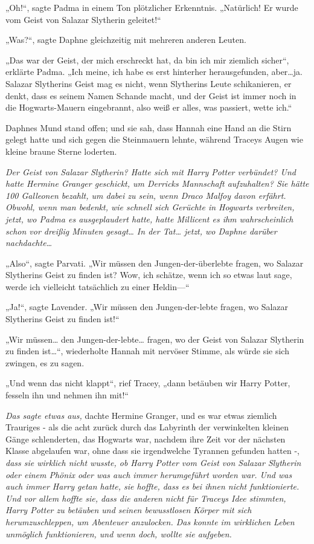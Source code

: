 {„Oh!“, sagte Padma in einem Ton plötzlicher Erkenntnis. „Natürlich! Er wurde vom Geist von Salazar Slytherin geleitet!“

„Was?“, sagte Daphne gleichzeitig mit mehreren anderen Leuten.

„Das war der Geist, der mich erschreckt hat, da bin ich mir ziemlich sicher“, erklärte Padma. „Ich meine, ich habe es erst hinterher herausgefunden, aber…ja. Salazar Slytherins Geist mag es nicht, wenn Slytherins Leute schikanieren, er denkt, dass es seinem Namen Schande macht, und der Geist ist immer noch in die Hogwarts-Mauern eingebrannt, also weiß er alles, was passiert, wette ich.“

Daphnes Mund stand offen; und sie sah, dass Hannah eine Hand an die Stirn gelegt hatte und sich gegen die Steinmauern lehnte, während Traceys Augen wie kleine braune Sterne loderten.

\emph{Der Geist von Salazar Slytherin? Hatte sich mit Harry Potter verbündet? Und hatte Hermine Granger geschickt, um Derricks Mannschaft aufzuhalten? Sie hätte 100 Galleonen bezahlt, um dabei zu sein, wenn Draco Malfoy davon erfährt. Obwohl, wenn man bedenkt, wie schnell sich Gerüchte in Hogwarts verbreiten, jetzt, wo Padma es ausgeplaudert hatte, hatte Millicent es ihm wahrscheinlich schon vor dreißig Minuten gesagt… In der Tat… jetzt, wo Daphne darüber nachdachte…}

„Also“, sagte Parvati. „Wir müssen den Jungen-der-überlebte fragen, wo Salazar Slytherins Geist zu finden ist? Wow, ich schätze, wenn ich so etwas laut sage, werde ich vielleicht tatsächlich zu einer Heldin—“

„Ja!“, sagte Lavender. „Wir müssen den Jungen-der-lebte fragen, wo Salazar Slytherins Geist zu finden ist!“

„Wir müssen… den Jungen-der-lebte… fragen, wo der Geist von Salazar Slytherin zu finden ist…“, wiederholte Hannah mit nervöser Stimme, als würde sie sich zwingen, es zu sagen.

„Und wenn das nicht klappt“, rief Tracey, „dann betäuben wir Harry Potter, fesseln ihn und nehmen ihn mit!“

\emph{Das sagte etwas aus,} dachte Hermine Granger, und es war etwas ziemlich Trauriges - als die acht zurück durch das Labyrinth der verwinkelten kleinen Gänge schlenderten, das Hogwarts war, nachdem ihre Zeit vor der nächsten Klasse abgelaufen war, ohne dass sie irgendwelche Tyrannen gefunden hatten -, \emph{dass sie wirklich nicht wusste, ob Harry Potter vom Geist von Salazar Slytherin oder einem Phönix oder was auch immer herumgeführt worden war. Und was auch immer Harry getan hatte, sie hoffte, dass es bei ihnen nicht funktionierte. Und vor allem hoffte sie, dass die anderen nicht für Traceys Idee stimmten, Harry Potter zu betäuben und seinen bewusstlosen Körper mit sich herumzuschleppen, um Abenteuer anzulocken. Das konnte im wirklichen Leben unmöglich funktionieren, und wenn doch, wollte sie aufgeben.}

}
